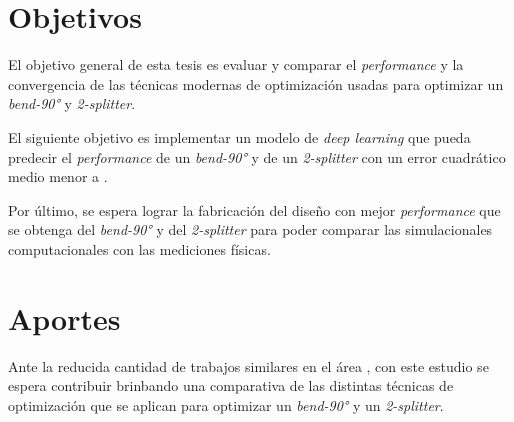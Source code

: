 \section{Objetivos}

El objetivo general de esta tesis es evaluar y comparar el \emph{performance} y la convergencia de las técnicas modernas de optimización usadas para optimizar un \emph{bend-90°} y \emph{2-splitter}.

El siguiente objetivo es implementar un modelo de \emph{deep learning} que pueda predecir el \emph{performance} de un \emph{bend-90°} y de un \emph{2-splitter} con un error cuadrático medio menor a . 

Por último, se espera lograr la fabricación del diseño con mejor \emph{performance} que se obtenga del \emph{bend-90°} y del \emph{2-splitter} para poder comparar las simulacionales computacionales con las mediciones físicas.

\section{Aportes}

Ante la reducida cantidad de trabajos similares en el área \cite{Schneider2019, Elsawy2020}, con este estudio se espera contribuir brinbando una comparativa de las distintas técnicas de optimización que se aplican para optimizar un \emph{bend-90°} y un \emph{2-splitter}. 
